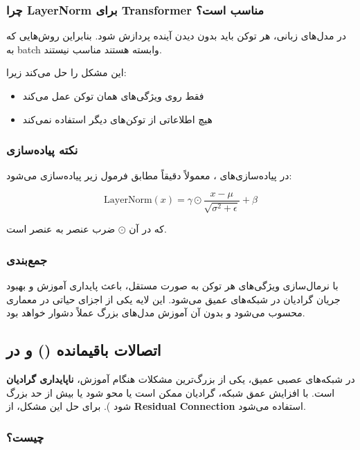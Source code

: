 \documentclass{article}
\begin{document}
\subsubsection*{چرا LayerNorm برای Transformer مناسب است؟}

در مدل‌های زبانی، هر توکن باید بدون دیدن آینده پردازش شود. بنابراین روش‌هایی که به batch وابسته هستند مناسب نیستند.

 این مشکل را حل می‌کند زیرا:

\begin{itemize}
	\item فقط روی ویژگی‌های همان توکن عمل می‌کند
	\item هیچ اطلاعاتی از توکن‌های دیگر استفاده نمی‌کند
\end{itemize}

\subsubsection*{نکته پیاده‌سازی}

در پیاده‌سازی‌های ، معمولاً  دقیقاً مطابق فرمول زیر پیاده‌سازی می‌شود:

\[
\text{LayerNorm}(x) =
\gamma \odot \frac{x - \mu}{\sqrt{\sigma^2 + \epsilon}} + \beta
\]

که در آن \( \odot \) ضرب عنصر به عنصر است.

\subsubsection*{جمع‌بندی}

 با نرمال‌سازی ویژگی‌های هر توکن به صورت مستقل، باعث پایداری آموزش و بهبود جریان گرادیان در شبکه‌های عمیق می‌شود. این لایه یکی از اجزای حیاتی در معماری  محسوب می‌شود و بدون آن آموزش مدل‌های بزرگ عملاً دشوار خواهد بود.

\subsection{اتصالات باقیمانده () و  در }

در شبکه‌های عصبی عمیق، یکی از بزرگ‌ترین مشکلات هنگام آموزش، \textbf{ناپایداری گرادیان} است. با افزایش عمق شبکه، گرادیان ممکن است یا محو شود  یا بیش از حد بزرگ شود ). برای حل این مشکل، از \textbf{Residual Connection} استفاده می‌شود.

\subsubsection*{ چیست؟}
\end{document}
